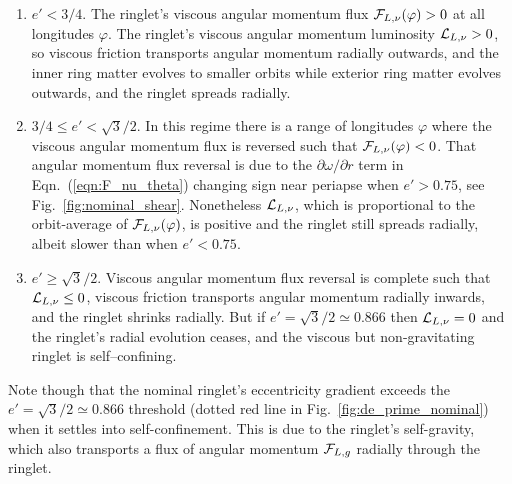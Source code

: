 \documentclass[preprint]{aastex62}
\begin{document}
\begin{enumerate}

\item $e'<3/4$. The ringlet's viscous angular momentum flux ${\cal F}_{L,\nu}(\varphi)>0$
at all longitudes $\varphi$. The ringlet's viscous
angular momentum luminosity ${\cal L}_{L,\nu}>0$, so viscous friction transports angular momentum radially outwards,
and the inner ring matter evolves to smaller orbits while exterior ring matter evolves outwards, and
the ringlet spreads radially.

\item $3/4\le e'<\sqrt{3}/2$. In this regime there is a range of longitudes $\varphi$
where the viscous angular momentum flux is reversed such that ${\cal F}_{L,\nu}(\varphi)<0$. 
That angular momentum flux reversal is due to the $\partial\omega/\partial r$
term in Eqn.\ (\ref{eqn:F_nu_theta}) changing sign near periapse when $e'>0.75$, 
see Fig.\ \ref{fig:nominal_shear}.
Nonetheless ${\cal L}_{L,\nu}$, which is proportional to the orbit-average of ${\cal F}_{L,\nu}(\varphi)$,
is positive and the ringlet still spreads radially, albeit slower than when $e'<0.75$.

\item $e'\ge\sqrt{3}/2$. Viscous angular momentum flux reversal is complete such that ${\cal L}_{L,\nu}\le0$,
viscous friction transports angular momentum radially inwards, and the ringlet
shrinks radially. But if $e'=\sqrt{3}/2\simeq0.866$ then ${\cal L}_{L,\nu}=0$ and the ringlet's
radial evolution ceases, and the viscous but non-gravitating ringlet is self--confining.

\end{enumerate}
 
Note though that the nominal ringlet's eccentricity gradient
exceeds the $e'=\sqrt{3}/2\simeq0.866$ threshold 
(dotted red line in Fig.\ \ref{fig:de_prime_nominal}) when it settles into
self-confinement. This is due to the ringlet's self-gravity,
which also transports a flux of angular momentum ${\cal F}_{L,g}$ radially through the ringlet.
\end{document}
